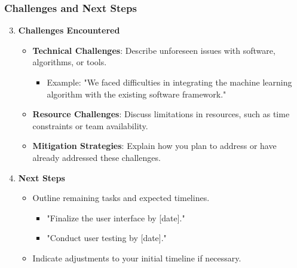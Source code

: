 \documentclass[aspectratio=169]{beamer}
\begin{document}
\begin{frame}[fragile]
    \frametitle{Challenges and Next Steps}
    \begin{enumerate}
        \setcounter{enumi}{2} %
        
        \item \textbf{Challenges Encountered}
            \begin{itemize}
                \item \textbf{Technical Challenges}: Describe unforeseen issues with software, algorithms, or tools.
                    \begin{itemize}
                        \item Example: "We faced difficulties in integrating the machine learning algorithm with the existing software framework."
                    \end{itemize}
                \item \textbf{Resource Challenges}: Discuss limitations in resources, such as time constraints or team availability.
                \item \textbf{Mitigation Strategies}: Explain how you plan to address or have already addressed these challenges.
            \end{itemize}

        \item \textbf{Next Steps}
            \begin{itemize}
                \item Outline remaining tasks and expected timelines.
                    \begin{itemize}
                        \item "Finalize the user interface by [date]."
                        \item "Conduct user testing by [date]."
                    \end{itemize}
                \item Indicate adjustments to your initial timeline if necessary.
            \end{itemize}
    \end{enumerate}
\end{frame}
\end{document}
